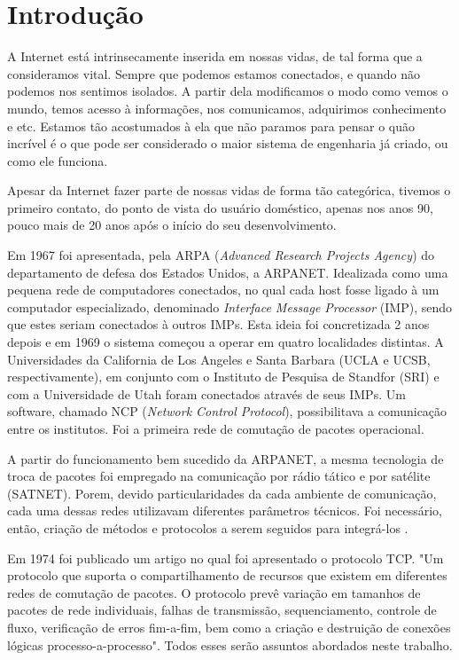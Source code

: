
\chapter{Introdução}
\label{chap:introducao}

A Internet está intrinsecamente inserida em nossas vidas, de tal forma que a consideramos vital. Sempre que podemos estamos conectados, e quando não podemos nos sentimos isolados. A partir dela modificamos o modo como vemos o mundo, temos acesso à informações, nos comunicamos, adquirimos conhecimento e etc. Estamos tão acostumados à ela que não paramos para pensar o quão incrível é o que pode ser considerado o maior sistema de engenharia já criado, ou como ele funciona.

Apesar da Internet fazer parte de nossas vidas de forma tão categórica, tivemos o primeiro contato, do ponto de vista do usuário doméstico, apenas nos anos 90, pouco mais de 20 anos após o início do seu desenvolvimento.

Em 1967 foi apresentada, pela ARPA (\textit{Advanced Research Projects Agency}) do departamento de defesa dos Estados Unidos, a ARPANET. Idealizada como uma pequena rede de computadores conectados, no qual cada host fosse ligado à um computador especializado, denominado \textit{Interface Message Processor} (IMP), sendo que estes seriam conectados à outros IMPs. Esta ideia foi concretizada 2 anos depois e em 1969 o sistema começou a operar em quatro localidades distintas. A Universidades da California de Los Angeles e Santa Barbara (UCLA e UCSB, respectivamente), em conjunto com o Instituto de Pesquisa de Standfor (SRI) e com a Universidade de Utah foram conectados através de seus IMPs. Um software, chamado NCP (\textit{Network Control Protocol}), possibilitava a comunicação entre os institutos. Foi a primeira rede de comutação de pacotes operacional\cite{Forouzan}.

A partir do funcionamento bem sucedido da ARPANET, a mesma tecnologia de troca de pacotes foi empregado na comunicação por rádio tático e por satélite (SATNET). Porem, devido particularidades da cada ambiente de comunicação, cada uma dessas redes utilizavam diferentes parâmetros técnicos. Foi necessário, então, criação de métodos e protocolos a serem seguidos para integrá-los \cite{STALLINGS}. 

Em 1974 foi publicado um artigo \cite{Cerf} no qual foi apresentado o protocolo TCP. "Um protocolo que suporta o compartilhamento de recursos que existem em diferentes redes de comutação de pacotes. O protocolo prevê variação em tamanhos de pacotes de rede individuais, falhas de transmissão, sequenciamento, controle de fluxo, verificação de erros fim-a-fim, bem como a criação e destruição de conexões lógicas processo-a-processo". Todos esses serão assuntos abordados neste trabalho.

